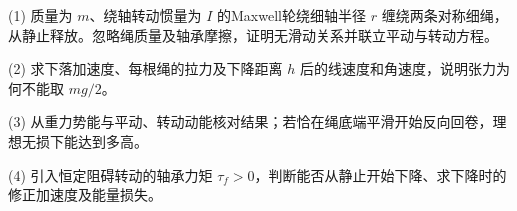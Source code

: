 (1) 质量为 \(m\)、绕轴转动惯量为 \(I\) 的Maxwell轮绕细轴半径 \(r\) 缠绕两条对称细绳，从静止释放。忽略绳质量及轴承摩擦，证明无滑动关系并联立平动与转动方程。

(2) 求下落加速度、每根绳的拉力及下降距离 \(h\) 后的线速度和角速度，说明张力为何不能取 \(mg/2\)。

(3) 从重力势能与平动、转动动能核对结果；若恰在绳底端平滑开始反向回卷，理想无损下能达到多高。

(4) 引入恒定阻碍转动的轴承力矩 \(\tau_f>0\)，判断能否从静止开始下降、求下降时的修正加速度及能量损失。
